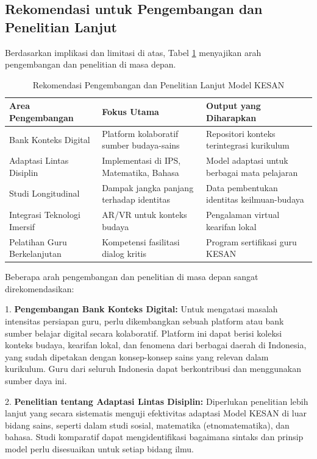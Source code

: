 \documentclass[12pt,a4paper,oneside]{book}
\begin{document}
\subsection{Rekomendasi untuk Pengembangan dan Penelitian Lanjut}

Berdasarkan implikasi dan limitasi di atas, Tabel \ref{tab:rekomendasi_lanjut} menyajikan arah pengembangan dan penelitian di masa depan.

\begin{table}[H]
\centering
\caption{Rekomendasi Pengembangan dan Penelitian Lanjut Model KESAN}
\label{tab:rekomendasi_lanjut}
\begin{tabular}{|p{4cm}|p{5cm}|p{5cm}|}
\hline
\textbf{Area Pengembangan} & \textbf{Fokus Utama} & \textbf{Output yang Diharapkan} \\
\hline
Bank Konteks Digital & Platform kolaboratif sumber budaya-sains & Repositori konteks terintegrasi kurikulum \\
\hline
Adaptasi Lintas Disiplin & Implementasi di IPS, Matematika, Bahasa & Model adaptasi untuk berbagai mata pelajaran \\
\hline
Studi Longitudinal & Dampak jangka panjang terhadap identitas & Data pembentukan identitas keilmuan-budaya \\
\hline
Integrasi Teknologi Imersif & AR/VR untuk konteks budaya & Pengalaman virtual kearifan lokal \\
\hline
Pelatihan Guru Berkelanjutan & Kompetensi fasilitasi dialog kritis & Program sertifikasi guru KESAN \\
\hline
\end{tabular}
\end{table}

Beberapa arah pengembangan dan penelitian di masa depan sangat direkomendasikan:

1.  \textbf{Pengembangan Bank Konteks Digital:} Untuk mengatasi masalah intensitas persiapan guru, perlu dikembangkan sebuah platform atau bank sumber belajar digital secara kolaboratif. Platform ini dapat berisi koleksi konteks budaya, kearifan lokal, dan fenomena dari berbagai daerah di Indonesia, yang sudah dipetakan dengan konsep-konsep sains yang relevan dalam kurikulum. Guru dari seluruh Indonesia dapat berkontribusi dan menggunakan sumber daya ini.

2.  \textbf{Penelitian tentang Adaptasi Lintas Disiplin:} Diperlukan penelitian lebih lanjut yang secara sistematis menguji efektivitas adaptasi Model KESAN di luar bidang sains, seperti dalam studi sosial, matematika (etnomatematika), dan bahasa. Studi komparatif dapat mengidentifikasi bagaimana sintaks dan prinsip model perlu disesuaikan untuk setiap bidang ilmu.
\end{document}
